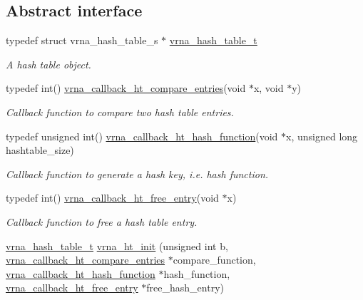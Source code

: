 \subsection*{Abstract interface}
\begin{DoxyCompactItemize}
\item 
typedef struct vrna\+\_\+hash\+\_\+table\+\_\+s $\ast$ \mbox{\hyperlink{group__hash__table__utils_gabc7c6f41b718c8e23929e528891a89c4}{vrna\+\_\+hash\+\_\+table\+\_\+t}}
\begin{DoxyCompactList}\small\item\em A hash table object. \end{DoxyCompactList}\item 
typedef int() \mbox{\hyperlink{group__hash__table__utils_gace4adf608f9dc246f66f6264d30c0f8d}{vrna\+\_\+callback\+\_\+ht\+\_\+compare\+\_\+entries}}(void $\ast$x, void $\ast$y)
\begin{DoxyCompactList}\small\item\em Callback function to compare two hash table entries. \end{DoxyCompactList}\item 
typedef unsigned int() \mbox{\hyperlink{group__hash__table__utils_ga8533dc0cb44035d5fdb05e3c28922d2b}{vrna\+\_\+callback\+\_\+ht\+\_\+hash\+\_\+function}}(void $\ast$x, unsigned long hashtable\+\_\+size)
\begin{DoxyCompactList}\small\item\em Callback function to generate a hash key, i.\+e. hash function. \end{DoxyCompactList}\item 
typedef int() \mbox{\hyperlink{group__hash__table__utils_ga3ff18cc70db8bb6f8cfee2c2b1542afc}{vrna\+\_\+callback\+\_\+ht\+\_\+free\+\_\+entry}}(void $\ast$x)
\begin{DoxyCompactList}\small\item\em Callback function to free a hash table entry. \end{DoxyCompactList}\item 
\mbox{\hyperlink{group__hash__table__utils_gabc7c6f41b718c8e23929e528891a89c4}{vrna\+\_\+hash\+\_\+table\+\_\+t}} \mbox{\hyperlink{group__hash__table__utils_ga37d1c7e13087a2b7c1b87fda34577c29}{vrna\+\_\+ht\+\_\+init}} (unsigned int b, \mbox{\hyperlink{group__hash__table__utils_gace4adf608f9dc246f66f6264d30c0f8d}{vrna\+\_\+callback\+\_\+ht\+\_\+compare\+\_\+entries}} $\ast$compare\+\_\+function, \mbox{\hyperlink{group__hash__table__utils_ga8533dc0cb44035d5fdb05e3c28922d2b}{vrna\+\_\+callback\+\_\+ht\+\_\+hash\+\_\+function}} $\ast$hash\+\_\+function, \mbox{\hyperlink{group__hash__table__utils_ga3ff18cc70db8bb6f8cfee2c2b1542afc}{vrna\+\_\+callback\+\_\+ht\+\_\+free\+\_\+entry}} $\ast$free\+\_\+hash\+\_\+entry)

\end{DoxyCompactItemize}
